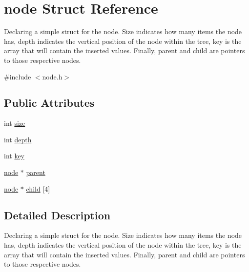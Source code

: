 \hypertarget{structnode}{\section{node \-Struct \-Reference}
\label{structnode}
}


\-Declaring a simple struct for the node. \-Size indicates how many items the node has, depth indicates the vertical position of the node within the tree, key is the array that will contain the inserted values. \-Finally, parent and child are pointers to those respective nodes.  




{\ttfamily \#include $<$node.\-h$>$}

\subsection*{\-Public \-Attributes}
\begin{DoxyCompactItemize}
\item 
int \hyperlink{structnode_ad2ae38303b19ab4f3e1b16b105a78b60}{size}
\item 
int \hyperlink{structnode_a24b9265ea66a07c6ff1bcc021f400082}{depth}
\item 
int \hyperlink{structnode_aa1417e7fad3ebcf42dc0ec8b711f273d}{key}
\item 
\hyperlink{structnode}{node} $\ast$ \hyperlink{structnode_a5e88137f1d0e2f7a940bccf4c3d3a4d3}{parent}
\item 
\hyperlink{structnode}{node} $\ast$ \hyperlink{structnode_aef19e5e5e309dbf0b83cc80450ac5b50}{child} \mbox{[}4\mbox{]}
\end{DoxyCompactItemize}


\subsection{\-Detailed \-Description}
\-Declaring a simple struct for the node. \-Size indicates how many items the node has, depth indicates the vertical position of the node within the tree, key is the array that will contain the inserted values. \-Finally, parent and child are pointers to those respective nodes. 

